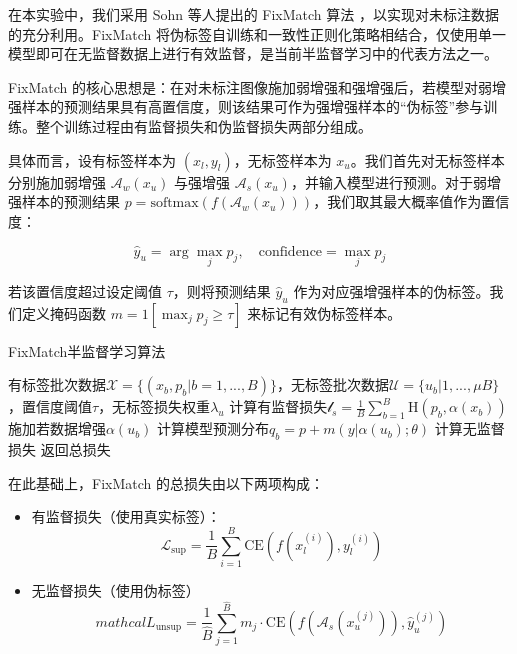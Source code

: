 \documentclass[a4paper, utf8]{ctexart}
\begin{document}
	在本实验中，我们采用 Sohn 等人提出的 FixMatch 算法 \cite{fixmatch}，以实现对未标注数据的充分利用。FixMatch 将伪标签自训练和一致性正则化策略相结合，仅使用单一模型即可在无监督数据上进行有效监督，是当前半监督学习中的代表方法之一。
	
	FixMatch 的核心思想是：在对未标注图像施加弱增强和强增强后，若模型对弱增强样本的预测结果具有高置信度，则该结果可作为强增强样本的“伪标签”参与训练。整个训练过程由有监督损失和伪监督损失两部分组成。
	
	具体而言，设有标签样本为 $(x_l, y_l)$，无标签样本为 $x_u$。我们首先对无标签样本分别施加弱增强 $\mathcal{A}_w(x_u)$ 与强增强 $\mathcal{A}_s(x_u)$，并输入模型进行预测。对于弱增强样本的预测结果 $p=\text{softmax}(f(\mathcal{A}_w(x_u)))$，我们取其最大概率值作为置信度：
	
	\vspace{-.5em}
	\begin{equation}
		\hat{y}_u=\arg\max_jp_j,\quad\text{confidence}=\max_jp_j
	\end{equation}
	
	若该置信度超过设定阈值 $\tau$，则将预测结果 $\hat{y}_u$ 作为对应强增强样本的伪标签。我们定义掩码函数 $m=1[\max_jp_j\geq\tau]$ 来标记有效伪标签样本。
	
    \begin{algorithm}
        \caption{FixMatch半监督学习算法}
        \begin{algorithmic}[1]
            \Require 有标签批次数据$\mathcal{X}=\{(x_b,p_b|b=1,...,B)\}$，无标签批次数据$\mathcal{U}=\{u_b|1,...,\mu B\}$，置信度阈值$\tau$，无标签损失权重$\lambda_u$
            \State 计算有监督损失$\mathscr{l}_s=\frac{1}{B}\sum^{B}_{b=1}\text{H}(p_b,\alpha(x_b))$
            \State 施加若数据增强$\alpha(u_b)$
            \State 计算模型预测分布$q_b=p+m(y|\alpha(u_b);\theta)$
            \EndFor
            \State 计算无监督损失
            \State 返回总损失
        \end{algorithmic}
    \end{algorithm}
	
	在此基础上，FixMatch 的总损失由以下两项构成：
	
	\begin{itemize}
		\item 有监督损失（使用真实标签）：
		\begin{equation}
			\mathcal{L}_{\text{sup}}=\frac{1}{B}\sum^{B}_{i=1}\text{CE}(f(x_l^{(i)}),y_l^{(i)})
		\end{equation}
		\item 无监督损失（使用伪标签）
		\begin{equation}
			mathcal{L}_{\text{unsup}}=\frac{1}{\hat{B}}\sum^{\hat{B}}_{j=1}m_j\cdot\text{CE}(f(\mathcal{A}_s(x_u^{(j)})),\hat{y}_u^{(j)})
		\end{equation}
	\end{itemize}
	
\end{document}

